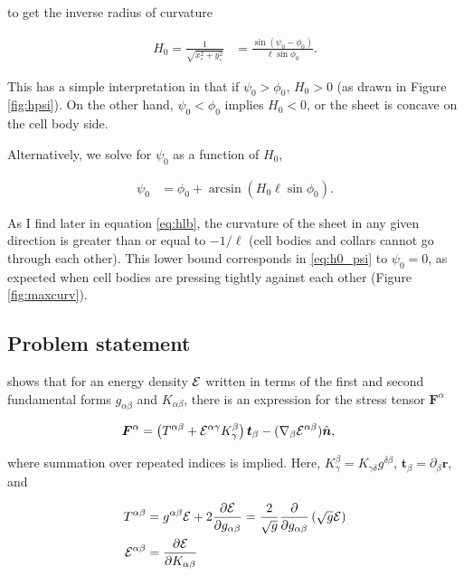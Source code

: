 \noindent to get the inverse radius of curvature 

\begin{align}
    H_0 = \frac{1}{\sqrt{x_\circ^2 + y_\circ^2}} &= \frac{\sin(\psi_0 - \phi_0)}{\ell \sin\phi_0}. \label{eq:h0}
\end{align}

This has a simple interpretation in that if $\psi_0 > \phi_0$, $H_0 > 0$ (as drawn in Figure \ref{fig:hpsi}). On the other hand, $\psi_0 < \phi_0$ implies $H_0 < 0$, or the sheet is concave on the cell body side. 

Alternatively, we solve for $\psi_0$ as a function of $H_0$,

\begin{align}
    \psi_0 &= \phi_0 + \arcsin \left( H_0 \ell \sin \phi_0 \right). \label{eq:h0_psi}
\end{align}

As I find later in equation \ref{eq:hlb}, the curvature of the sheet in any given direction is greater than or equal to $-1/\ell$ (cell bodies and collars cannot go through each other). 
This lower bound corresponds in \ref{eq:h0_psi} to $\psi_0 = 0$, as expected when cell bodies are pressing tightly against each other (Figure \ref{fig:maxcurv}).

\subsection{Problem statement} \label{subsec:problem}

\citet{powers2010} shows that for an energy density $\mathcal{E}$ written in terms of the first and second fundamental forms $g_{\alpha\beta}$ and $K_{\alpha\beta}$, there is an expression for the stress tensor $\bm{F}^\alpha$ 

\begin{align}
    \bm{F}^\alpha &= \left(T^{\alpha\beta} + \mathcal{E}^{\alpha\gamma}K_\gamma^\beta \right)\bm{t}_\beta - (\nabla_\beta \mathcal{E}^{\alpha\beta})\hat{\bm{n}}, \label{eq:stress}
\end{align}

\noindent where summation over repeated indices is implied. Here, $K_\gamma^\beta = K_{\gamma \delta}g^{\delta \beta}$, $\bm{t}_\beta = \partial_\beta \bm{r}$, and 

\begin{align*}
    T^{\alpha\beta} &= g^{\alpha\beta} \mathcal{E} + 2 \frac{\partial \mathcal{E}}{\partial g_{\alpha\beta}} = \frac{2}{\sqrt{g}} \frac{\partial}{\partial g_{\alpha\beta}} \left(\sqrt{g}\mathcal{E} \right) \\
    \mathcal{E}^{\alpha\beta} &= \frac{\partial \mathcal{E}}{\partial K_{\alpha\beta}}
\end{align*}

